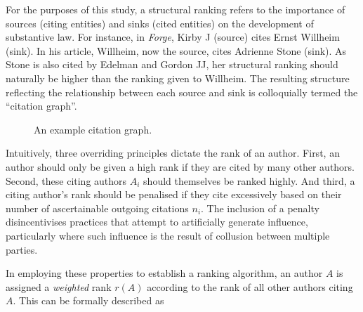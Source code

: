 For the purposes of this study, a structural ranking refers to the importance of sources (citing entities) and sinks (cited entities) on the development of substantive law. For instance, in \textit{Forge}, Kirby J (source) cites Ernst Willheim (sink). In his article, Willheim, now the source, cites Adrienne Stone (sink). As Stone is also cited by Edelman and Gordon JJ, her structural ranking should naturally be higher than the ranking given to Willheim. The resulting structure reflecting the relationship between each source and sink is colloquially termed the ``citation graph''.

\begin{figure}[!htpb]
\centering
{}
\caption{An example citation graph.}
\end{figure}

Intuitively, three overriding principles dictate the rank of an author. First, an author should only be given a high rank if they are cited by many other authors. Second, these citing authors $A_i$ should themselves be ranked highly. And third, a citing author's rank should be penalised if they cite excessively based on their number of ascertainable outgoing citations $n_i$. The inclusion of a penalty disincentivises practices that attempt to artificially generate influence, particularly where such influence is the result of collusion between multiple parties. 

In employing these properties to establish a ranking algorithm, an author $A$ is assigned a \emph{weighted} rank $r(A)$ according to the rank of all other authors citing $A$. This can be formally described as

